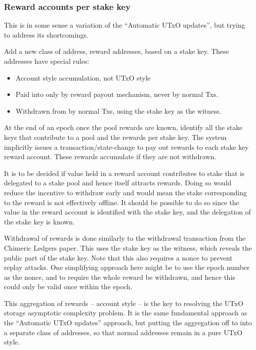 \documentclass[11pt,a4paper]{article}
\begin{document}
\subsubsection{Reward accounts per stake key}
\label{reward-accounts-per-stake-key}

This is in some sense a variation of the ``Automatic UTxO updates'', but
trying to address its shortcomings.

Add a new class of address, reward addresses, based on a stake key.
These addresses have special rules:

\begin{itemize}
\item
  Account style accumulation, not UTxO style
\item
  Paid into only by reward payout mechanism, never by normal Txs.
\item
  Withdrawn from by normal Txs, using the stake key as the witness.
\end{itemize}

At the end of an epoch once the pool rewards are known, identify all the
stake keys that contribute to a pool and the rewards per stake key. The
system implicitly issues a transaction/state-change to pay out rewards
to each stake key reward account. These rewards accumulate if they are
not withdrawn.

It is to be decided if value held in a reward account contributes to
stake that is delegated to a stake pool and hence itself attracts
rewards. Doing so would reduce the incentive to withdraw early and would
mean the stake corresponding to the reward is not effectively offline.
It should be possible to do so since the value in the reward account is
identified with the stake key, and the delegation of the stake key is
known.

Withdrawal of rewards is done similarly to the withdrawal transaction
from the Chimeric Ledgers paper. This uses the stake key as the witness,
which reveals the public part of the stake key. Note that this also
requires a nonce to prevent replay attacks. One simplifying approach
here might be to use the epoch number as the nonce, and to require the
whole reward be withdrawn, and hence this could only be valid once
within the epoch.

This aggregation of rewards -- account style -- is the key to resolving
the UTxO storage asymptotic complexity problem. It is the same
fundamental approach as the ``Automatic UTxO updates'' approach, but
putting the aggregation off to into a separate class of addresses, so
that normal addresses remain in a pure UTxO style.
\end{document}

